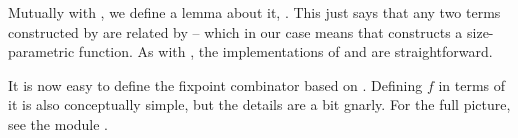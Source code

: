 Mutually with , we define a lemma about it,
. This just says that any two terms constructed by
 are related by  -- which in our case means that
 constructs a size-parametric function. As with
, the implementations of  and
 are straightforward.

It is now easy to define the fixpoint combinator  based on
. Defining $f$ in terms of it is also conceptually simple, but
the details are a bit gnarly. For the full picture, see the module
.
